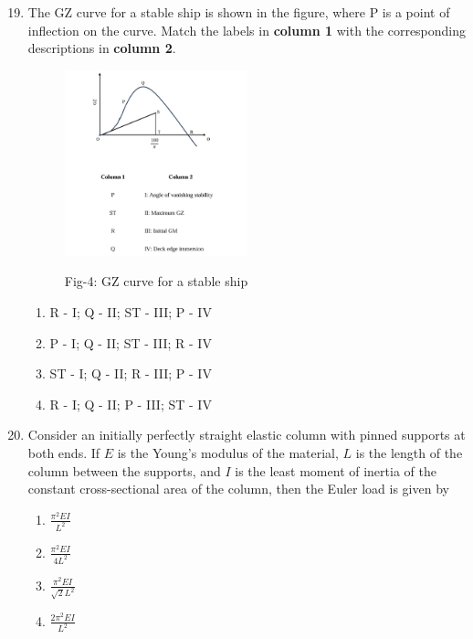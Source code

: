 \documentclass[journal]{IEEEtran}
\theoremstyle{remark}
\begin{document}
\newpage
\vspace*{0.25cm}

\begin{enumerate}[itemsep=1em]
\setcounter{enumi}{18}
\item The GZ curve for a stable ship is shown in the figure, where P is a point of inflection on the curve. Match the labels in \textbf{column 1} with the corresponding descriptions in \textbf{column 2}. 
\begin{figure}[H]
    \centering
    \caption*{Fig-4: GZ curve for a stable ship}
    \includegraphics[width=0.5\textwidth]{figs/fig-4.jpeg}
    \label{fig-4}
\end{figure}
\begin{enumerate}[leftmargin=2.5em, labelsep=0.5em, itemsep=0.5em]
      \item R - I; Q - II; ST - III; P - IV 
      \item P - I; Q - II; ST - III; R - IV 
      \item ST - I; Q - II; R - III; P - IV   
      \item R - I; Q - II; P - III; ST - IV  
\end{enumerate}

\end{enumerate}

\begin{enumerate}[itemsep=1em]
\setcounter{enumi}{19}
\item Consider an initially perfectly straight elastic column with pinned supports at both ends. If $E$ is the Young's modulus of the material, $L$ is the length of the column between the supports, and $I$ is the least moment of inertia of the constant cross-sectional area of the column, then the Euler load is given by
\begin{multicols}{4}
\begin{enumerate}
      \item $\frac{\pi^2EI}{L^2}$
      \item $\frac{\pi^2EI}{4L^2}$
      \item $\frac{\pi^2EI}{\sqrt{2}L^2}$  
      \item $\frac{2\pi^2EI}{L^2}$
\end{enumerate}
\end{multicols}
\end{enumerate}
\end{document}

